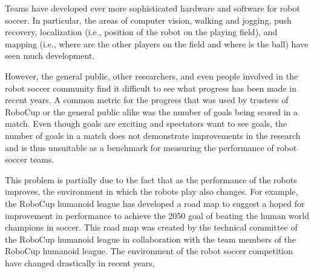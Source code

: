 \documentclass[runningheads]{llncs}
\begin{document}
Teams have developed ever more sophisticated hardware and software for robot soccer.
In particular, the areas of computer vision, walking and jogging, push recovery, localization (i.e., position of the robot on the playing field), and mapping (i.e., where are the other players on the field and where is the ball) have seen much development.

However, the general public, other researchers, and even people involved in the robot soccer community find it difficult to see what progress has been made in recent years.
A common metric for the progress that was used by trustees of RoboCup or the general public alike was the number of goals being scored in a match.
Even though goals are exciting and spectators want to see goals, the number of goals in a match does not demonstrate improvements in the research and is thus unsuitable as a benchmark for measuring the performance of robot soccer teams.

This problem is partially due to the fact that as the performance of the robots improves, the environment in which the robots play also changes.
For example, the RoboCup humanoid league has developed a road map to suggest a hoped for improvement in performance to achieve the 2050 goal of beating the human world champions in soccer.
This road map was created by the technical committee of the RoboCup humanoid league in collaboration with the team members of the RoboCup humanoid league.
The environment of the robot soccer competition have changed drastically in recent years,
\end{document}
